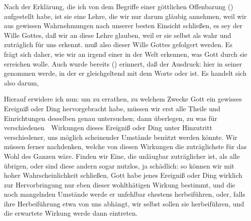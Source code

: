 \begin{aufza}
\item Nach der Erklärung, die ich von dem Begriffe einer göttlichen Offenbarung () aufgestellt habe, ist sie eine Lehre, die wir nur darum gläubig annehmen, weil wir aus gewissen Wahrnehmungen nach unserer besten Einsicht schließen, es sey der Wille Gottes, daß wir an diese Lehre glauben, weil er sie selbst als wahr und zuträglich für uns erkennt.  muß also dieser Wille Gottes gefolgert werden. Es frägt sich daher, wie wir an irgend einer  in der Welt erkennen, was Gott durch sie erreichen wolle. Auch wurde bereits () erinnert, daß der Ausdruck:  hier in seiner  genommen werde, in der er gleichgeltend mit dem Worte  oder  ist. Es handelt sich also darum, 
\item Hierauf erwidere ich nun: um zu errathen, zu welchem Zwecke Gott ein gewisses Ereigniß oder Ding hervorgebracht habe, müssen wir erst alle Theile und Einrichtungen desselben genau untersuchen; dann überlegen, zu was für verschiedenen~\ Wirkungen dieses Ereigniß oder Ding unter Hinzutritt verschiedener, uns möglich scheinender Umstände benützt werden könnte. Wir müssen ferner nachdenken, welche von diesen Wirkungen die zuträglichste für das Wohl des Ganzen wäre. Finden wir Eine, die unläugbar zuträglicher ist, als alle übrigen, oder sind diese andern sogar nutzlos, ja schädlich: so können wir mit hoher Wahrscheinlichkeit schließen, Gott habe jenes Ereigniß oder Ding wirklich zur Hervorbringung nur eben dieser wohlthätigen Wirkung bestimmt, und die noch mangelnden Umstände werde er unfehlbar ehestens herbeiführen, oder, falls ihre Herbeiführung etwa von uns abhängt, wir selbst sollen sie herbeiführen, und die erwartete Wirkung werde dann eintreten.

\end{aufza}
